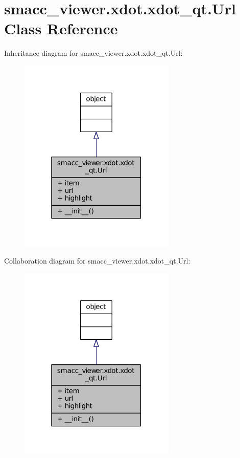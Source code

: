 \hypertarget{classsmacc__viewer_1_1xdot_1_1xdot__qt_1_1Url}{}\section{smacc\+\_\+viewer.\+xdot.\+xdot\+\_\+qt.\+Url Class Reference}
\label{classsmacc__viewer_1_1xdot_1_1xdot__qt_1_1Url}


Inheritance diagram for smacc\+\_\+viewer.\+xdot.\+xdot\+\_\+qt.\+Url\+:
\nopagebreak
\begin{figure}[H]
\begin{center}
\leavevmode
\includegraphics[width=211pt]{classsmacc__viewer_1_1xdot_1_1xdot__qt_1_1Url__inherit__graph}
\end{center}
\end{figure}


Collaboration diagram for smacc\+\_\+viewer.\+xdot.\+xdot\+\_\+qt.\+Url\+:
\nopagebreak
\begin{figure}[H]
\begin{center}
\leavevmode
\includegraphics[width=211pt]{classsmacc__viewer_1_1xdot_1_1xdot__qt_1_1Url__coll__graph}
\end{center}
\end{figure}
